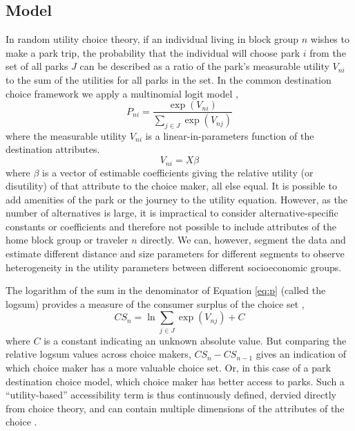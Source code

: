 \documentclass[]{elsarticle} %
\begin{document}
\hypertarget{model}{%
\subsection{Model}\label{model}}

In random utility choice theory, if an individual living in block group \(n\)
wishes to make a park trip, the probability that the individual will choose
park \(i\) from the set of all parks \(J\) can be described as a ratio of the
park's measurable utility \(V_{ni}\) to the sum of the utilities for all parks
in the set. In the common destination choice framework we apply a
multinomial logit model \citep[\citet{Recker1978}]{McFadden1974},
\begin{equation}\label{eq:p}
   P_{ni} = \frac{\exp(V_{ni})}{\sum_{j \in J}\exp(V_{nj})}
\end{equation}
where the measurable utility \(V_{ni}\) is a linear-in-parameters function of
the destination attributes.
\begin{equation}\label{eq:V}
V_{ni} = X\beta
\end{equation}
where \(\beta\) is a vector of estimable coefficients giving the relative utility
(or disutility) of that attribute to the choice maker, all else equal. It is
possible to add amenities of the park or the journey to the utility
equation. However, as the number of alternatives is large, it is impractical to
consider alternative-specific constants or coefficients and therefore not
possible to include attributes of the home block group or traveler \(n\) directly.
We can, however, segment the data and estimate different distance and size
parameters for different segments to observe heterogeneity in the utility
parameters between different socioeconomic groups.

The logarithm of the sum in the denominator of Equation \ref{eq:p} (called the
logsum) provides a measure of the consumer surplus of the choice set
\citep{Williams1977a},
\begin{equation}\label{eq:logsum}
CS_n = \ln{{\sum_{j \in J}\exp(V_{nj})}} + C
\end{equation}
where \(C\) is a constant indicating an unknown absolute value. But comparing the
relative logsum values across choice makers, \(CS_n - CS_{n-1}\) gives an
indication of which choice maker has a more valuable choice set. Or, in this
case of a park destination choice model, which choice maker has better access to
parks. Such a ``utility-based'' accessibility term is thus continuously defined,
dervied directly from choice theory, and can contain multiple dimensions of the
attributes of the choice \citep{Handy1997, Dong2006}.
\end{document}
